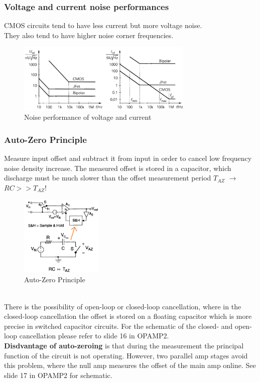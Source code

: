 		\subsubsection{Voltage and current noise performances}
			CMOS circuits tend to have less current but more voltage noise.\\
			They also tend to have higher noise corner frequencies.  
			\begin{figure}[h]
				\centering
				\includegraphics[width=0.75\textwidth]{images/VoltageCurrentNoise.png}
				\caption{Noise performance of voltage and current}
				\label{Fig:VoltageCurrentNoise}
			\end{figure}
			
		\subsubsection{Auto-Zero Principle}
			Measure input offset and subtract it from input in order to cancel low frequency noise density increase. 
			The measured offset is stored in a capacitor, which discharge must be much slower than the offset measurement period $T_{AZ}$ $\rightarrow$ $RC >> T_{AZ}$! 
			\begin{figure}[h]
				\centering
				\includegraphics[width=0.35\textwidth]{images/AutoZeroPrinzip.png}
				\caption{Auto-Zero Principle}
				\label{Fig:AutoZeroPrinzip}
			\end{figure}
			\\
			There is the possibility of open-loop or closed-loop cancellation, where in the closed-loop cancellation the offset is stored on a floating capacitor which is more precise in switched capacitor circuits. For the schematic of the closed- and open-loop cancellation please refer to slide 16 in OPAMP2. \\
			\textbf{Disdvantage of auto-zeroing} is that during the measurement the principal function of the circuit is not operating. However, two parallel amp stages avoid this problem, where the null amp measures the offset of the main amp online. See slide 17 in OPAMP2 for schematic. 
			
